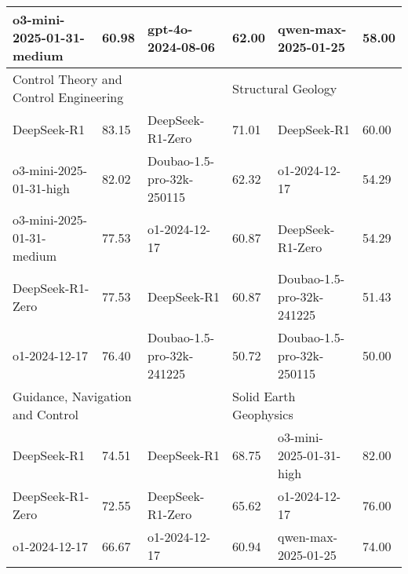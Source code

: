 {\begin{longtable}{p{4.2cm}>{\centering\arraybackslash} p{0.8cm}|p{4.2cm} >{\centering\arraybackslash} p{0.8cm}|p{4.2cm} >{\centering\arraybackslash} p{0.8cm}}
\cellcolor{blue!5} o3-mini-2025-01-31-medium & \cellcolor{blue!2}60.98 & \cellcolor{purple!5} gpt-4o-2024-08-06 & \cellcolor{purple!2} 62.00 & \cellcolor{green!5} qwen-max-2025-01-25 & \cellcolor{green!2} 58.00\\
\hline
\multicolumn{2}{p{5.15cm}|}{\cellcolor{blue!10} \centering Control Theory and Control Engineering} & \multicolumn{2}{p{5.15cm}|}{\cellcolor{purple!10} \centering Literary History} & \multicolumn{2}{p{5.15cm}}{\cellcolor{green!10} \centering Structural Geology}\\
\hline
\cellcolor{blue!5} DeepSeek-R1 & \cellcolor{blue!2}83.15 & \cellcolor{purple!5} DeepSeek-R1-Zero & \cellcolor{purple!2} 71.01 & \cellcolor{green!5} DeepSeek-R1 & \cellcolor{green!2} 60.00\\
\cellcolor{blue!5} o3-mini-2025-01-31-high & \cellcolor{blue!2}82.02 & \cellcolor{purple!5} Doubao-1.5-pro-32k-250115 & \cellcolor{purple!2} 62.32 & \cellcolor{green!5} o1-2024-12-17 & \cellcolor{green!2} 54.29\\
\cellcolor{blue!5} o3-mini-2025-01-31-medium & \cellcolor{blue!2}77.53 & \cellcolor{purple!5} o1-2024-12-17 & \cellcolor{purple!2} 60.87 & \cellcolor{green!5} DeepSeek-R1-Zero & \cellcolor{green!2} 54.29\\
\cellcolor{blue!5} DeepSeek-R1-Zero & \cellcolor{blue!2}77.53 & \cellcolor{purple!5} DeepSeek-R1 & \cellcolor{purple!2} 60.87 & \cellcolor{green!5} Doubao-1.5-pro-32k-241225 & \cellcolor{green!2} 51.43\\
\cellcolor{blue!5} o1-2024-12-17 & \cellcolor{blue!2}76.40 & \cellcolor{purple!5} Doubao-1.5-pro-32k-241225 & \cellcolor{purple!2} 50.72 & \cellcolor{green!5} Doubao-1.5-pro-32k-250115 & \cellcolor{green!2} 50.00\\
\hline
\multicolumn{2}{p{5.15cm}|}{\cellcolor{blue!10} \centering Guidance, Navigation and Control} & \multicolumn{2}{p{5.15cm}|}{\cellcolor{purple!10} \centering Literary Theory} & \multicolumn{2}{p{5.15cm}}{\cellcolor{green!10} \centering Solid Earth Geophysics}\\
\hline
\cellcolor{blue!5} DeepSeek-R1 & \cellcolor{blue!2}74.51 & \cellcolor{purple!5} DeepSeek-R1 & \cellcolor{purple!2} 68.75 & \cellcolor{green!5} o3-mini-2025-01-31-high & \cellcolor{green!2} 82.00\\
\cellcolor{blue!5} DeepSeek-R1-Zero & \cellcolor{blue!2}72.55 & \cellcolor{purple!5} DeepSeek-R1-Zero & \cellcolor{purple!2} 65.62 & \cellcolor{green!5} o1-2024-12-17 & \cellcolor{green!2} 76.00\\
\cellcolor{blue!5} o1-2024-12-17 & \cellcolor{blue!2}66.67 & \cellcolor{purple!5} o1-2024-12-17 & \cellcolor{purple!2} 60.94 & \cellcolor{green!5} qwen-max-2025-01-25 & \cellcolor{green!2} 74.00\\

\end{longtable}}
